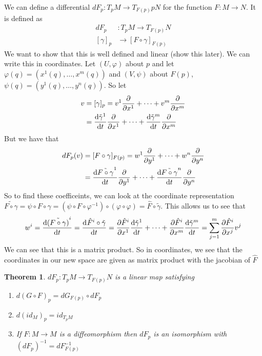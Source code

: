 \documentclass[a4paper]{article}
\newtheorem*{thm}{Theorem}
\begin{document}
We can define a differential $dF_p: T_pM \rightarrow T_{F(p)}pN$ for the function $F: M \rightarrow N$.  It is defined as
\[
  \begin{aligned}
    dF_p&: T_pM \rightarrow T_{F(p)}N \\
    [\gamma]_p& \rightarrow [F \circ \gamma]_{F(p)}
  \end{aligned}
\]
We want to show that this is well defined and linear (show this later). We can write this in coordinates. Let $(U, \varphi)$ about $p$ and let $\varphi(q) = (x^1(q), \dots, x^m(q))$ and $(V, \psi)$ about $F(p)$, $\psi(q) = (y^1(q), \dots, y^n(q))$. So let
\[
  \begin{aligned}
    v &= [\gamma]_p = v^1 \pdv{}{x^1} + \cdots + v^m \pdv{}{x^m}\\
      &=\dv{\tilde{\gamma}^1}{t} \pdv{}{x^1} + \cdots +  \dv{\tilde{\gamma}^m}{t}\pdv{}{x^m}\\
  \end{aligned}
\]
But we have that
\[
  \begin{aligned}
    dF_p(v) &= [F \circ \gamma]_{F(p)} = w^1 \pdv{}{y^1} + \cdots + w^n \pdv{}{y^n} \\
            &= \dv{\tilde{F \circ \gamma}^1}{t} \pdv{}{y^1} + \cdots + \dv{\tilde{F \circ \gamma}^n}{t} \pdv{}{y^n} \\
  \end{aligned}
\]
So to find these coefficeints, we can look at the coordinate representation $\tilde{F \circ \gamma} = \psi \circ F \circ \gamma = (\psi \circ F \circ \varphi^{-1}) \circ (\varphi \circ \varphi) = \hat{F} \circ \tilde{\gamma}$. This allows us to see that
\[
  w^i = \dv{\tilde{(F \circ \gamma)}^i}{t} = \dv[]{\hat{F}^i \circ \tilde{\gamma}}{t} = 
  \pdv{\hat{F}^i}{x^1} \dv{\tilde{\gamma}^1}{t} + \cdots + \pdv{\hat{F}^i}{x^m} \dv{\tilde{\gamma}^m}{t} = \sum_{j=1}^m \pdv{\hat{F}^i}{x^j}v^j
\]
We can see that this is a matrix product. So in coordinates, we see that the coordinates in our new space are given as matrix product with the jacobian of $\hat{F}$

\begin{thm}
  $dF_p: T_pM \rightarrow T_{F(p)}N$ is a linear map satisfying
  \begin{enumerate}
    \item $d(G \circ F)_p = dG_{F(p)} \circ dF_p$
    \item $d(id_M)_p = id_{T_pM}$
    \item If $F: M \rightarrow M$ is a diffeomorphism then $dF_p$ is an isomorphism with $(dF_p)^{-1} = dF^{-1}_{F(p)}$
  \end{enumerate}
\end{thm}
\end{document}
